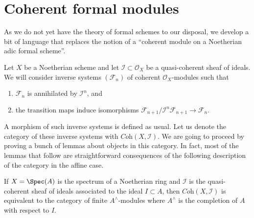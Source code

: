\section{Coherent formal modules}
\label{section-coherent-formal}

\noindent
As we do not yet have the theory of formal schemes to our disposal, we
develop a bit of language that replaces the notion of a ``coherent module on a
Noetherian adic formal scheme''.

\medskip\noindent
Let $X$ be a Noetherian scheme and let $\mathcal{I} \subset \mathcal{O}_X$
be a quasi-coherent sheaf of ideals. We will consider inverse
systems $(\mathcal{F}_n)$ of coherent $\mathcal{O}_X$-modules such that
\begin{enumerate}
\item $\mathcal{F}_n$ is annihilated by $\mathcal{I}^n$, and
\item the transition maps induce isomorphisms
$\mathcal{F}_{n + 1}/\mathcal{I}^n\mathcal{F}_{n + 1} \to \mathcal{F}_n$.
\end{enumerate}
A morphism of such inverse systems is defined as usual.
Let us denote the category of these inverse systems with
$\textit{Coh}(X, \mathcal{I})$. We are going to proceed by proving
a bunch of lemmas about objects in this category. In fact, most
of the lemmas that follow are straightforward consequences of the following
description of the category in the affine case.

\begin{lemma}
\label{lemma-inverse-systems-affine}
If $X = \Spec(A)$ is the spectrum of a Noetherian ring and
$\mathcal{I}$ is the quasi-coherent sheaf of ideals associated to the ideal
$I \subset A$, then $\textit{Coh}(X, \mathcal{I})$ is equivalent to the
category of finite $A^\wedge$-modules where $A^\wedge$ is the completion
of $A$ with respect to $I$.
\end{lemma}

